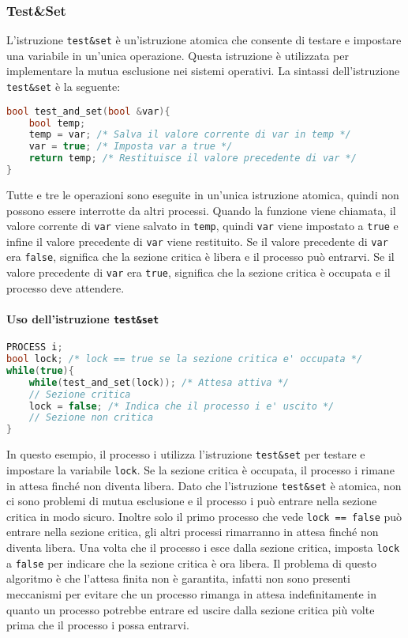         \subsubsection{Test\&Set}
            L'istruzione \texttt{test\&set} è un'istruzione atomica che consente di testare e impostare una variabile in un'unica operazione. Questa istruzione è utilizzata per implementare la mutua esclusione nei sistemi operativi. La sintassi dell'istruzione \texttt{test\&set} è la seguente:
            \begin{lstlisting}[language=C++, morekeywords={mov, eax, add}]
bool test_and_set(bool &var){
    bool temp;
    temp = var; /* Salva il valore corrente di var in temp */
    var = true; /* Imposta var a true */
    return temp; /* Restituisce il valore precedente di var */
}
            \end{lstlisting}
            Tutte e tre le operazioni sono eseguite in un'unica istruzione atomica, quindi non possono essere interrotte da altri processi. Quando la funzione viene chiamata, il valore corrente di \texttt{var} viene salvato in \texttt{temp}, quindi \texttt{var} viene impostato a \texttt{true} e infine il valore precedente di \texttt{var} viene restituito. Se il valore precedente di \texttt{var} era \texttt{false}, significa che la sezione critica è libera e il processo può entrarvi. Se il valore precedente di \texttt{var} era \texttt{true}, significa che la sezione critica è occupata e il processo deve attendere.
            \paragraph{Uso dell'istruzione \texttt{test\&set}}
                \begin{lstlisting}[language=C++,basicstyle=\footnotesize]
PROCESS i;
bool lock; /* lock == true se la sezione critica e' occupata */
while(true){
    while(test_and_set(lock)); /* Attesa attiva */
    // Sezione critica
    lock = false; /* Indica che il processo i e' uscito */
    // Sezione non critica
}
                \end{lstlisting}
                In questo esempio, il processo i utilizza l'istruzione \texttt{test\&set} per testare e impostare la variabile \texttt{lock}. Se la sezione critica è occupata, il processo i rimane in attesa finché non diventa libera. Dato che l'istruzione \texttt{test\&set} è atomica, non ci sono problemi di mutua esclusione e il processo i può entrare nella sezione critica in modo sicuro. Inoltre solo il primo processo che vede \texttt{lock == false} può entrare nella sezione critica, gli altri processi rimarranno in attesa finché non diventa libera. Una volta che il processo i esce dalla sezione critica, imposta \texttt{lock} a \texttt{false} per indicare che la sezione critica è ora libera. Il problema di questo algoritmo è che l'attesa finita non è garantita, infatti non sono presenti meccanismi per evitare che un processo rimanga in attesa indefinitamente in quanto un processo potrebbe entrare ed uscire dalla sezione critica più volte prima che il processo i possa entrarvi.
